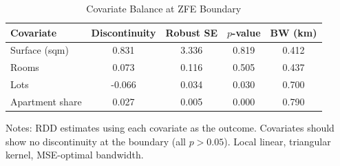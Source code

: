 \begin{table}[H]
\centering
\caption{Covariate Balance at ZFE Boundary}
\begin{threeparttable}
\begin{tabular}{lcccc}
\toprule
Covariate & Discontinuity & Robust SE & $p$-value & BW (km) \\
\midrule
Surface (sqm)  &  0.831  &  3.336  &  0.819  &  0.412  \\
Rooms  &  0.073  &  0.116  &  0.505  &  0.437  \\
Lots  &  -0.066  &  0.034  &  0.030  &  0.700  \\
Apartment share  &  0.027  &  0.005  &  0.000  &  0.790  \\
\bottomrule
\end{tabular}
\begin{tablenotes}[flushleft]
\small
\item Notes: RDD estimates using each covariate as the outcome.  Covariates should show no discontinuity at the boundary (all $p > 0.05$).  Local linear, triangular kernel, MSE-optimal bandwidth.
\end{tablenotes}
\end{threeparttable}
\label{tab:balance}
\end{table}
